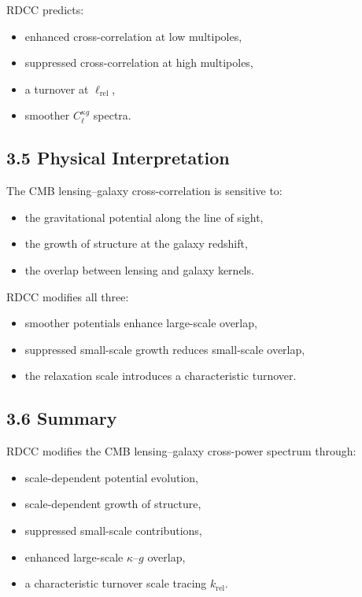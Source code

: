 \documentclass[11pt,a4paper]{article}
\begin{document}
RDCC predicts:

\begin{itemize}
    \item enhanced cross-correlation at low multipoles,
    \item suppressed cross-correlation at high multipoles,
    \item a turnover at $\ell_{\mathrm{rel}}$,
    \item smoother $C_{\ell}^{\kappa g}$ spectra.
\end{itemize}

\subsection*{3.5 Physical Interpretation}

The CMB lensing–galaxy cross-correlation is sensitive to:

\begin{itemize}
    \item the gravitational potential along the line of sight,
    \item the growth of structure at the galaxy redshift,
    \item the overlap between lensing and galaxy kernels.
\end{itemize}

RDCC modifies all three:

\begin{itemize}
    \item smoother potentials enhance large-scale overlap,
    \item suppressed small-scale growth reduces small-scale overlap,
    \item the relaxation scale introduces a characteristic turnover.
\end{itemize}

\subsection*{3.6 Summary}

RDCC modifies the CMB lensing–galaxy cross-power spectrum through:

\begin{itemize}
    \item scale-dependent potential evolution,
    \item scale-dependent growth of structure,
    \item suppressed small-scale contributions,
    \item enhanced large-scale $\kappa$–$g$ overlap,
    \item a characteristic turnover scale tracing $k_{\mathrm{rel}}$.
\end{itemize}
\end{document}
